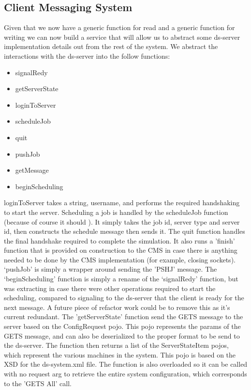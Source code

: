 \documentclass[12pt, letterpaper]{article}
\begin{document}
\subsection*{Client Messaging System}
Given that we now have a generic function for read and a generic function for writing we can now build a service that will allow us to abstract some ds-server implementation details out from the rest of the system.
We abstract the interactions with the ds-server into the follow functions:
\begin{itemize}
    \item signalRedy
    \item getServerState
    \item loginToServer
    \item scheduleJob
    \item quit
    \item pushJob
    \item getMessage
    \item beginScheduling
\end{itemize}
loginToServer takes a string, username, and performs the required handshaking to start the server.
Scheduling a job is handled by the scheduleJob function (because of course it should \cite{loureiro_2015}). It simply takes the job id, server type and server id, then constructs the schedule message then sends it.
The quit function handles the final handshake required to complete the simulation. It also runs a 'finish' function that is provided on construction to the CMS in case there is anything needed to be done by the CMS implementation (for example, closing sockets).
`pushJob' is simply a wrapper around sending the 'PSHJ' message. The `beginScheduling' function is simply a rename of the `signalRedy' function, but was extracting in case there were other operations required to start the scheduling, compared to signaling to the ds-server that the client is ready for the next message. A future piece of refactor work could be to remove this as it's current redundant. 
\newline
The 'getServerState' function send the GETS message to the server based on the ConfigRequest pojo.
This pojo represents the params of the GETS message, and can also be deserialized to the proper format to be send to the ds-server.
The function then returns a list of the ServerStateItem pojos, which represent the various machines in the system. This pojo is based on the XSD for the ds-system.xml file.
The function is also overloaded so it can be called with no request arg to retrieve the entire system configuration, which corresponds to the 'GETS All' call.
\end{document}
